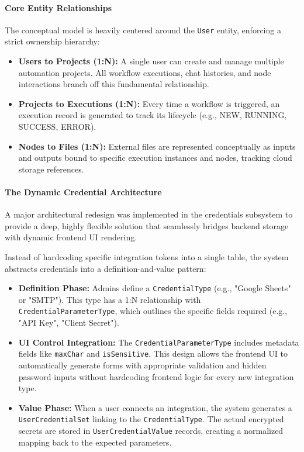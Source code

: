 
\paragraph{Core Entity Relationships}
The conceptual model is heavily centered around the \texttt{User} entity, enforcing a strict ownership hierarchy:
\begin{itemize}
    \item \textbf{Users to Projects (1:N):} A single user can create and manage multiple automation projects. All workflow executions, chat histories, and node interactions branch off this fundamental relationship.
    \item \textbf{Projects to Executions (1:N):} Every time a workflow is triggered, an execution record is generated to track its lifecycle (e.g., NEW, RUNNING, SUCCESS, ERROR).
    \item \textbf{Nodes to Files (1:N):} External files are represented conceptually as inputs and outputs bound to specific execution instances and nodes, tracking cloud storage references.
\end{itemize}

\paragraph{The Dynamic Credential Architecture}
A major architectural redesign was implemented in the credentials subsystem to provide a deep, highly flexible solution that seamlessly bridges backend storage with dynamic frontend UI rendering. 

Instead of hardcoding specific integration tokens into a single table, the system abstracts credentials into a definition-and-value pattern:
\begin{itemize}
    \item \textbf{Definition Phase:} Admins define a \texttt{CredentialType} (e.g., "Google Sheets" or "SMTP"). This type has a 1:N relationship with \texttt{CredentialParameterType}, which outlines the specific fields required (e.g., "API Key", "Client Secret").
    \item \textbf{UI Control Integration:} The \texttt{CredentialParameterType} includes metadata fields like \texttt{maxChar} and \texttt{isSensitive}. This design allows the frontend UI to automatically generate forms with appropriate validation and hidden password inputs without hardcoding frontend logic for every new integration type.
    \item \textbf{Value Phase:} When a user connects an integration, the system generates a \texttt{UserCredentialSet} linking to the \texttt{CredentialType}. The actual encrypted secrets are stored in \texttt{UserCredentialValue} records, creating a normalized mapping back to the expected parameters.
\end{itemize}

